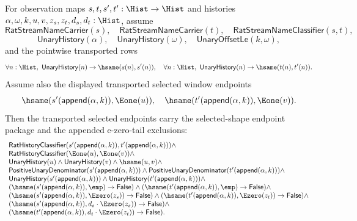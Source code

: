 \begin{theorem}
\label{thm:real-unary-streamname-finite-window-transported-selected-appended-tail-package}
For observation maps $s,t,s',t':\Hist\to\Hist$ and histories
$\alpha,\omega,k,u,v,z_s,z_t,d_s,d_t:\Hist$, assume
$$
\mathsf{RatStreamNameCarrier}(s),\quad
\mathsf{RatStreamNameCarrier}(t),\quad
\mathsf{RatStreamNameClassifier}(s,t),
$$
$$
\mathsf{UnaryHistory}(\alpha),\quad
\mathsf{UnaryHistory}(\omega),\quad
\mathsf{UnaryOffsetLe}(k,\omega),
$$
and the pointwise transported rows
$$
\forall n:\Hist,\ \mathsf{UnaryHistory}(n)\to\hsame(s(n),s'(n)),
\quad
\forall n:\Hist,\ \mathsf{UnaryHistory}(n)\to\hsame(t(n),t'(n)).
$$
Assume also the displayed transported selected window endpoints
$$
\hsame(s'(\mathsf{append}(\alpha,k)),\Eone(u)),
\quad
\hsame(t'(\mathsf{append}(\alpha,k)),\Eone(v)).
$$
Then the transported selected endpoints carry the selected-shape endpoint
package and the appended e-zero-tail exclusions:
$$
\begin{array}{l}
\mathsf{RatHistoryClassifier}(s'(\mathsf{append}(\alpha,k)),t'(\mathsf{append}(\alpha,k)))\land\\
\mathsf{RatHistoryClassifier}(\Eone(u),\Eone(v))\land\\
\mathsf{UnaryHistory}(u)\land\mathsf{UnaryHistory}(v)\land\hsame(u,v)\land\\
\mathsf{PositiveUnaryDenominator}(s'(\mathsf{append}(\alpha,k)))\land
\mathsf{PositiveUnaryDenominator}(t'(\mathsf{append}(\alpha,k)))\land\\
\mathsf{UnaryHistory}(s'(\mathsf{append}(\alpha,k)))\land
\mathsf{UnaryHistory}(t'(\mathsf{append}(\alpha,k)))\land\\
(\hsame(s'(\mathsf{append}(\alpha,k)),\emp)\to\mathsf{False})\land
(\hsame(t'(\mathsf{append}(\alpha,k)),\emp)\to\mathsf{False})\land\\
(\hsame(s'(\mathsf{append}(\alpha,k)),\Ezero(z_s))\to\mathsf{False})\land
(\hsame(t'(\mathsf{append}(\alpha,k)),\Ezero(z_t))\to\mathsf{False})\land\\
(\hsame(s'(\mathsf{append}(\alpha,k)),d_s\cdot\Ezero(z_s))\to
\mathsf{False})\land\\
(\hsame(t'(\mathsf{append}(\alpha,k)),d_t\cdot\Ezero(z_t))\to
\mathsf{False}).
\end{array}
$$
\end{theorem}
